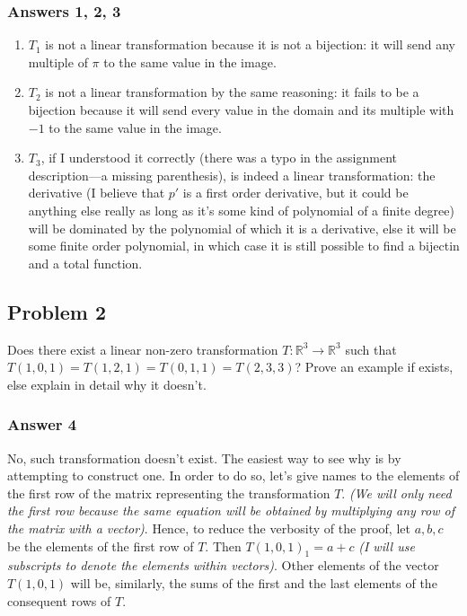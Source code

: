 \documentclass[fleqn]{article}
\begin{document}
\subsubsection{Answers 1, 2, 3}
\label{sec-1-1-1}
\begin{enumerate}
\item $T_1$ is not a linear transformation because it is not a bijection: it will
send any multiple of $\pi$ to the same value in the image.
\item $T_2$ is not a linear transformation by the same reasoning: it fails to be
a bijection because it will send every value in the domain and its multiple
with $-1$ to the same value in the image.
\item $T_3$, if I understood it correctly (there was a typo in the assignment
description---a missing parenthesis), is indeed a linear transformation:
the derivative (I believe that $p'$ is a first order derivative, but it 
could be anything else really as long as it's some kind of polynomial of
a finite degree) will be dominated by the polynomial of which it is a 
derivative, else it will be some finite order polynomial, in which case it
is still possible to find a bijectin and a total function.
\end{enumerate}
\subsection{Problem 2}
\label{sec-1-2}
Does there exist a linear non-zero transformation $T:\mathbb{R}^3\to\mathbb{R}^3$
such that $T(1,0,1)=T(1,2,1)=T(0,1,1)=T(2,3,3)$?  Prove an example if exists,
else explain in detail why it doesn't.

\subsubsection{Answer 4}
\label{sec-1-2-1}
No, such transformation doesn't exist.  The easiest way to see why is by
attempting to construct one.  In order to do so, let's give names to the
elements of the first row of the matrix representing the transformation $T$.
\emph{(We will only need the first row because the same equation will be obtained}
\emph{by multiplying any row of the matrix with a vector)}.  Hence, to reduce
the verbosity of the proof, let $a,b,c$ be the elements of the first row of
$T$.  Then $T(1,0,1)_1=a+c$ \emph{(I will use subscripts to denote the elements}
\emph{within vectors)}.  Other elements of the vector $T(1,0,1)$ will be, similarly,
the sums of the first and the last elements of the consequent rows of $T$.
\end{document}
